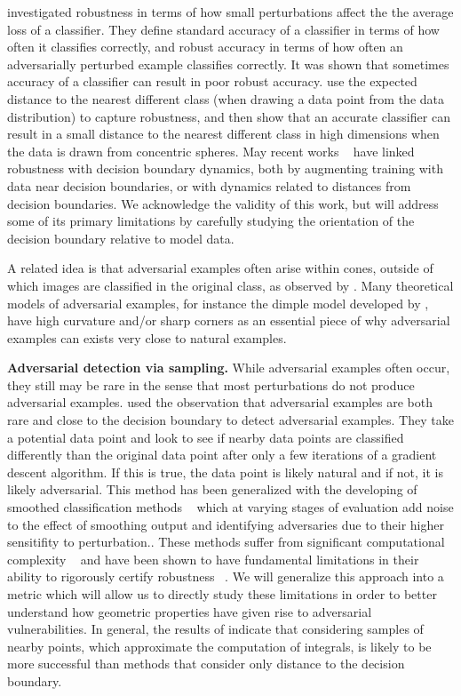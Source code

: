 \citet{tsipras2018robustness} investigated robustness in terms of how
small perturbations affect the the average loss of a classifier. They
define standard accuracy of a classifier in terms of how often it
classifies correctly, and robust accuracy in terms of how often an
adversarially perturbed example classifies correctly. It was shown
that sometimes accuracy of a classifier can result in poor robust
accuracy. \citet{gilmer2018adversarial} use the expected distance to
the nearest different class (when drawing a data point from the data
distribution) to capture robustness, and then show that an accurate
classifier can result in a small distance to the nearest different
class in high dimensions when the data is drawn from concentric
spheres. May recent works ~\citep{he2018decision, chen2023aware,
  jin2022roby} have linked robustness with decision boundary dynamics,
both by augmenting training with data near decision boundaries, or
with dynamics related to distances from decision boundaries. We
acknowledge the validity of this work, but will address some of its
primary limitations by carefully studying the orientation
of the decision boundary relative to model data.

A related idea is that adversarial examples often arise within cones,
outside of which images are classified in the original class, as
observed by \citet{roth19aodds}. Many theoretical models of
adversarial examples, for instance the dimple model developed by
\citet{shamir2021}, have high curvature and/or sharp corners as an
essential piece of why adversarial examples can exists very close to
natural examples. 

{\bf Adversarial detection via sampling.}
While adversarial examples often occur, they still may be rare in the
sense that most perturbations do not produce adversarial
examples. \citet{yu2019new} used the observation that adversarial
examples are both rare and close to the decision boundary to detect
adversarial examples. They take a potential data point and look to see
if nearby data points are classified differently than the original
data point after only a few iterations of a gradient descent
algorithm. If this is true, the data point is likely natural and if
not, it is likely adversarial. This method has been generalized with
the developing of smoothed classification methods
~\citep{cohen2019certified, lecuyer2019certified, li2019certified}
which at varying stages of evaluation add noise to the effect of
smoothing output and identifying adversaries due to their higher
sensitifity to perturbation.. These methods suffer from significant
computational complexity ~\citep{kumar2020curse} and have been shown
to have fundamental limitations in their ability to rigorously certify
robustness ~\citep{blum2020random, yang2020randomized}. We will generalize this approach into a metric which will allow us to directly study these limitations in order to better understand how geometric properties have given rise to adversarial vulnerabilities. In general, the results of \citet{yu2019new} indicate that considering samples of nearby points, which approximate the computation of integrals, is likely to be more successful than methods that consider only distance to the decision boundary.

